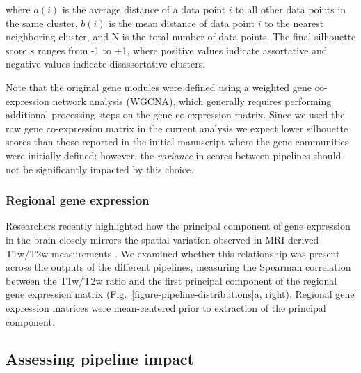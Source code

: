 \documentclass[12pt,aps,pra,reprint,showkeys]{revtex4-1}
\begin{document}
\noindent where $a(i)$ is the average distance of a data point $i$ to all other data points in the same cluster, $b(i)$ is the mean distance of data point $i$ to the nearest neighboring cluster, and N is the total number of data points.
The final silhouette score $s$ ranges from -1 to +1, where positive values indicate assortative and negative values indicate disassortative clusters.

Note that the original gene modules were defined using a weighted gene co-expression network analysis (WGCNA), which generally requires performing additional processing steps on the gene co-expression matrix.
Since we used the raw gene co-expression matrix in the current analysis we expect lower silhouette scores than those reported in the initial manuscript where the gene communities were initially defined; however, the \emph{variance} in scores between pipelines should not be significantly impacted by this choice.

\subsubsection*{Regional gene expression}

Researchers recently highlighted how the principal component of gene expression in the brain closely mirrors the spatial variation observed in MRI-derived T1w/T2w measurements \citep[typically used as a proxy for myelination;][]{burt2018natneuro}.
We examined whether this relationship was present across the outputs of the different pipelines, measuring the Spearman correlation between the T1w/T2w ratio and the first principal component of the regional gene expression matrix (Fig.~\ref{figure-pipeline-distributions}a, right).
Regional gene expression matrices were mean-centered prior to extraction of the principal component.

\subsection*{Assessing pipeline impact}
\end{document}
